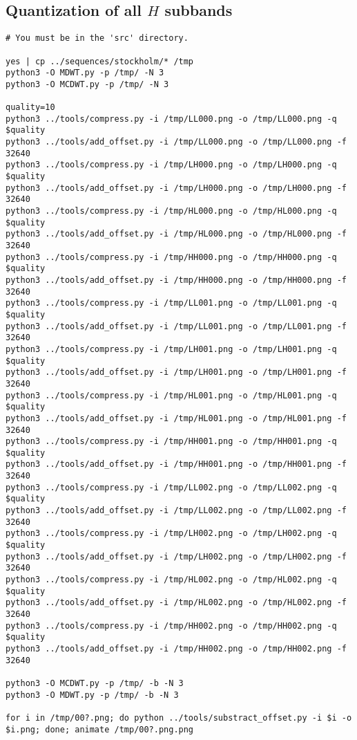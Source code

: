 \subsection*{Quantization of all $H$ subbands}
\begin{verbatim}
# You must be in the 'src' directory.

yes | cp ../sequences/stockholm/* /tmp
python3 -O MDWT.py -p /tmp/ -N 3
python3 -O MCDWT.py -p /tmp/ -N 3

quality=10
python3 ../tools/compress.py -i /tmp/LL000.png -o /tmp/LL000.png -q $quality
python3 ../tools/add_offset.py -i /tmp/LL000.png -o /tmp/LL000.png -f 32640
python3 ../tools/compress.py -i /tmp/LH000.png -o /tmp/LH000.png -q $quality
python3 ../tools/add_offset.py -i /tmp/LH000.png -o /tmp/LH000.png -f 32640
python3 ../tools/compress.py -i /tmp/HL000.png -o /tmp/HL000.png -q $quality
python3 ../tools/add_offset.py -i /tmp/HL000.png -o /tmp/HL000.png -f 32640
python3 ../tools/compress.py -i /tmp/HH000.png -o /tmp/HH000.png -q $quality
python3 ../tools/add_offset.py -i /tmp/HH000.png -o /tmp/HH000.png -f 32640
python3 ../tools/compress.py -i /tmp/LL001.png -o /tmp/LL001.png -q $quality
python3 ../tools/add_offset.py -i /tmp/LL001.png -o /tmp/LL001.png -f 32640
python3 ../tools/compress.py -i /tmp/LH001.png -o /tmp/LH001.png -q $quality
python3 ../tools/add_offset.py -i /tmp/LH001.png -o /tmp/LH001.png -f 32640
python3 ../tools/compress.py -i /tmp/HL001.png -o /tmp/HL001.png -q $quality
python3 ../tools/add_offset.py -i /tmp/HL001.png -o /tmp/HL001.png -f 32640
python3 ../tools/compress.py -i /tmp/HH001.png -o /tmp/HH001.png -q $quality
python3 ../tools/add_offset.py -i /tmp/HH001.png -o /tmp/HH001.png -f 32640
python3 ../tools/compress.py -i /tmp/LL002.png -o /tmp/LL002.png -q $quality
python3 ../tools/add_offset.py -i /tmp/LL002.png -o /tmp/LL002.png -f 32640
python3 ../tools/compress.py -i /tmp/LH002.png -o /tmp/LH002.png -q $quality
python3 ../tools/add_offset.py -i /tmp/LH002.png -o /tmp/LH002.png -f 32640
python3 ../tools/compress.py -i /tmp/HL002.png -o /tmp/HL002.png -q $quality
python3 ../tools/add_offset.py -i /tmp/HL002.png -o /tmp/HL002.png -f 32640
python3 ../tools/compress.py -i /tmp/HH002.png -o /tmp/HH002.png -q $quality
python3 ../tools/add_offset.py -i /tmp/HH002.png -o /tmp/HH002.png -f 32640

python3 -O MCDWT.py -p /tmp/ -b -N 3
python3 -O MDWT.py -p /tmp/ -b -N 3

for i in /tmp/00?.png; do python ../tools/substract_offset.py -i $i -o $i.png; done; animate /tmp/00?.png.png
\end{verbatim}

